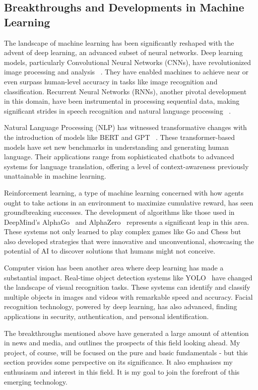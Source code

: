 \documentclass[letterpaper,10pt]{article}
\begin{document}
\subsection{Breakthroughs and Developments in Machine Learning}
The landscape of machine learning has been significantly reshaped with the advent of deep learning, an advanced subset of neural networks. Deep learning models, particularly Convolutional Neural Networks (CNNs), have revolutionized image processing and analysis ~\cite{CNNImageClassification}. They have enabled machines to achieve near or even surpass human-level accuracy in tasks like image recognition and classification. Recurrent Neural Networks (RNNs), another pivotal development in this domain, have been instrumental in processing sequential data, making significant strides in speech recognition and natural language processing~\cite{RNNSequentialLearning} .\par
Natural Language Processing (NLP) has witnessed transformative changes with the introduction of models like BERT and GPT ~\cite{BERT_NLP, NLP_Transformer}. These transformer-based models have set new benchmarks in understanding and generating human language. Their applications range from sophisticated chatbots to advanced systems for language translation, offering a level of context-awareness previously unattainable in machine learning. \par
Reinforcement learning, a type of machine learning concerned with how agents ought to take actions in an environment to maximize cumulative reward, has seen groundbreaking successes. The development of algorithms like those used in DeepMind's AlphaGo~\cite{AlphaGoDeepMind} and AlphaZero~\cite{AlphaZeroDeepMind} represents a significant leap in this area. These systems not only learned to play complex games like Go and Chess but also developed strategies that were innovative and unconventional, showcasing the potential of AI to discover solutions that humans might not conceive. \par
Computer vision has been another area where deep learning has made a substantial impact. Real-time object detection systems like YOLO~\cite{YOLODetection} have changed the landscape of visual recognition tasks. These systems can identify and classify multiple objects in images and videos with remarkable speed and accuracy. Facial recognition technology, powered by deep learning, has also advanced, finding applications in security, authentication, and personal identification. \par
The breakthroughs mentioned above have generated a large amount of attention in news and media, and outlines the prospects of this field looking ahead. My project, of course, will be focused on the pure and basic fundamentals - but this section provides some perspective on its significance. It also emphasises my enthusiasm and interest in this field. It is my goal to join the forefront of this emerging technology.
\end{document}
